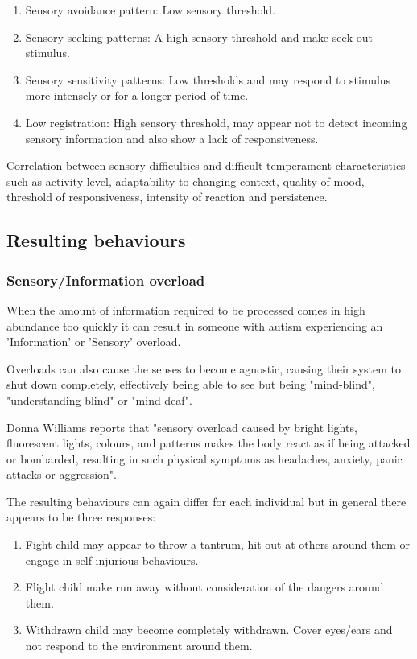 \documentclass[11pt]{report}
\begin{document}
\begin{enumerate}
\item Sensory avoidance pattern: Low sensory threshold. 
\item Sensory seeking patterns: A high sensory threshold and make seek out stimulus.
\item Sensory sensitivity patterns: Low thresholds and may respond to stimulus more intensely or for a longer period of time.
\item Low registration: High sensory threshold, may appear not to detect incoming sensory information and also show a lack of responsiveness.
\end{enumerate}

Correlation between sensory difficulties and difficult temperament characteristics such as activity level, adaptability to changing context, quality of mood, threshold of responsiveness, intensity of reaction and persistence\cite{temperament}. 

\subsection{Resulting behaviours}


\subsubsection{Sensory/Information overload}

When the amount of information required to be processed comes in high abundance too quickly it can result in someone with autism experiencing an 'Information' or 'Sensory' overload.

Overloads can also cause the senses to become agnostic, causing their system to shut down completely, effectively being able to see but being "mind-blind", "understanding-blind" or "mind-deaf".

Donna Williams reports that "sensory overload caused by bright lights, fluorescent lights, colours, and patterns makes the body react as if being attacked or bombarded, resulting in such physical symptoms as headaches, anxiety,
panic attacks or aggression"\cite{bayes}.

The resulting behaviours can again differ for each individual but in general there appears to be three responses:

\begin{enumerate}
\item Fight child may appear to throw a tantrum, hit out at others around them or engage in self injurious behaviours. 
\item Flight child make run away without consideration of the dangers around them.
\item Withdrawn child may become completely withdrawn. Cover eyes/ears and not respond to the environment around them. 
\end{enumerate}
\end{document}
